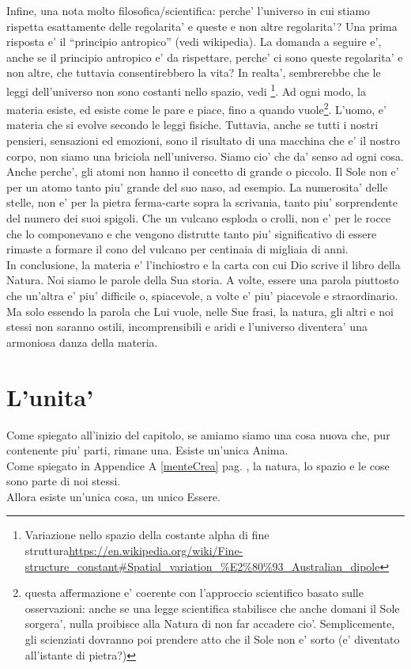 Infine, una nota molto filosofica/scientifica: perche' l'universo in cui stiamo rispetta esattamente delle regolarita' e queste e non altre regolarita'? Una prima risposta e' il ``principio antropico'' (vedi wikipedia). La domanda a seguire e', anche se il principio antropico e' da rispettare, perche' ci sono queste regolarita' e non altre, che tuttavia consentirebbero la vita? In realta', sembrerebbe che le leggi dell'universo non sono costanti nello spazio, vedi \footnote{Variazione nello spazio della costante alpha di fine struttura\url{https://en.wikipedia.org/wiki/Fine-structure\_constant\#Spatial\_variation\_\%E2\%80\%93\_Australian\_dipole}}. Ad ogni modo, la materia esiste, ed esiste come le pare e piace, fino a quando vuole\footnote{questa affermazione e' coerente con l'approccio scientifico basato sulle osservazioni: anche se una legge scientifica stabilisce che anche domani il Sole sorgera', nulla proibisce alla Natura di non far accadere cio'. Semplicemente, gli scienziati dovranno poi prendere atto che il Sole non e' sorto (e' diventato all'istante di pietra?)}.
L'uomo, e' materia che si evolve secondo le leggi fisiche. Tuttavia, anche se tutti i nostri pensieri, sensazioni ed emozioni, sono il risultato di una macchina che e' il nostro corpo, non siamo una briciola nell'universo. Siamo cio' che da' senso ad ogni cosa. Anche perche', gli atomi non hanno il concetto di grande o piccolo. Il Sole non e' per un atomo tanto piu' grande del suo naso, ad esempio. La numerosita' delle stelle, non e' per la pietra ferma-carte sopra la scrivania, tanto piu' sorprendente del numero dei suoi spigoli. Che un vulcano esploda o crolli, non e' per le rocce che lo componevano e che vengono distrutte tanto piu' significativo di essere rimaste a formare il cono del vulcano per centinaia di migliaia di anni.\\

In conclusione, la materia e' l'inchiostro e la carta con cui Dio scrive il libro della Natura. Noi siamo le parole della Sua storia. A volte, essere una parola piuttosto che un'altra e' piu' difficile o, spiacevole, a volte e' piu' piacevole e straordinario. Ma solo essendo la parola che Lui vuole, nelle Sue frasi, la natura, gli altri e noi stessi non saranno ostili, incomprensibili e aridi e l'universo diventera' una armoniosa danza della materia.


\section{L'unita'}
Come spiegato all'inizio del capitolo, se amiamo siamo una cosa nuova che, pur contenente piu' parti, rimane una. Esiste un'unica Anima.\\
Come spiegato in Appendice A \ref{menteCrea} pag. \pageref{menteCrea}, la natura, lo spazio e le cose sono parte di noi stessi.\\
Allora esiste un'unica cosa, un unico Essere.\\

